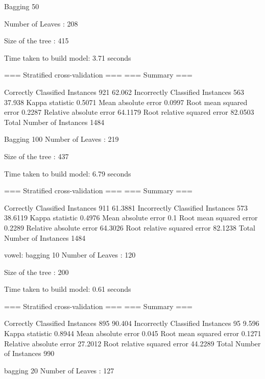 Bagging 50

Number of Leaves  : 	208

Size of the tree : 	415




Time taken to build model: 3.71 seconds

=== Stratified cross-validation ===
=== Summary ===

Correctly Classified Instances         921               62.062  %
Incorrectly Classified Instances       563               37.938  %
Kappa statistic                          0.5071
Mean absolute error                      0.0997
Root mean squared error                  0.2287
Relative absolute error                 64.1179 %
Root relative squared error             82.0503 %
Total Number of Instances             1484     


Bagging 100
Number of Leaves  : 	219

Size of the tree : 	437




Time taken to build model: 6.79 seconds

=== Stratified cross-validation ===
=== Summary ===

Correctly Classified Instances         911               61.3881 %
Incorrectly Classified Instances       573               38.6119 %
Kappa statistic                          0.4976
Mean absolute error                      0.1   
Root mean squared error                  0.2289
Relative absolute error                 64.3026 %
Root relative squared error             82.1238 %
Total Number of Instances             1484



vowel:
bagging 10
Number of Leaves  : 	120

Size of the tree : 	200




Time taken to build model: 0.61 seconds

=== Stratified cross-validation ===
=== Summary ===

Correctly Classified Instances         895               90.404  %
Incorrectly Classified Instances        95                9.596  %
Kappa statistic                          0.8944
Mean absolute error                      0.045 
Root mean squared error                  0.1271
Relative absolute error                 27.2012 %
Root relative squared error             44.2289 %
Total Number of Instances              990

bagging 20
Number of Leaves  : 	127

